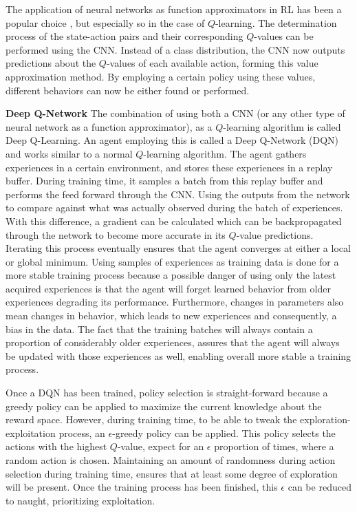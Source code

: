 The application of neural networks as function approximators in RL has been 
a popular choice \cite{rlanoverview}, but especially so in the case of 
$Q$-learning. The determination process of the state-action pairs and their 
corresponding $Q$-values can be performed using the CNN. 
Instead of a class distribution, the CNN now outputs predictions about 
the $Q$-values of each available action, forming this value approximation method.
By employing a certain policy using these values, different behaviors can now 
be either found or performed.   \newline


\noindent
\textbf{Deep Q-Network} \newline
The combination of using both a CNN (or any other type of neural network as a function 
approximator), as a $Q$-learning algorithm is called Deep Q-Learning. An agent 
employing this is called a Deep Q-Network (DQN) \cite{DQNDeepmind} and
works similar to a normal $Q$-learning algorithm. The agent gathers 
experiences in a certain environment, and stores these experiences in a 
replay buffer. During training time, it samples a batch from this 
replay buffer and performs the feed forward through the CNN. Using the  
outputs from the network to compare against what was actually 
observed during the batch of experiences. With this difference, a gradient 
can be calculated which can be backpropagated through the network to become more 
accurate in its $Q$-value predictions. Iterating this process eventually ensures 
that the agent converges at either a local or global minimum. 
Using samples of experiences as training data is done for a more stable training process 
because a possible danger of using only the latest acquired experiences is that the agent 
will forget learned behavior from older experiences degrading its performance.  Furthermore,
changes in parameters also mean changes in behavior, which leads to new experiences 
and consequently, a bias in the data. The fact that the training batches will always 
contain a proportion of considerably older experiences, assures that the agent will always 
be updated with those experiences as well, enabling overall more stable a training 
process.

Once a DQN has been trained, policy selection is straight-forward because a 
greedy policy can be applied to maximize the current knowledge about the reward 
space. However, during training time, to be able to tweak the 
exploration-exploitation process, an $\epsilon$-greedy policy can be applied. 
This policy selects the actions 
with the highest $Q$-value, expect for an $\epsilon$ proportion of times, 
where a random action is chosen. Maintaining an amount of randomness during 
action selection during training time, ensures that at least some degree 
of exploration will be present. Once the training process has been finished, 
this $\epsilon$ can be reduced to naught, prioritizing exploitation. 
